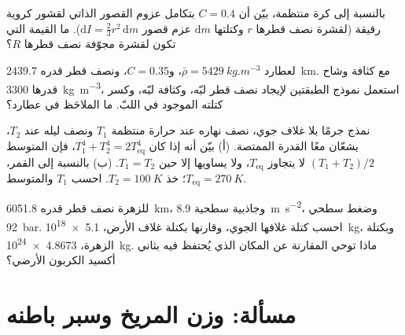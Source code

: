 \begin{exercise}[$\star\star$]\label{exo:b1:comparative-planetology:9}
بالنسبة إلى كرة منتظمة، بيّن أن $C = 0.4$ بتكامل عزوم القصور الذاتي لقشور كروية رقيقة (لقشرة نصف قطرها $r$ وكتلتها $\mathrm dm$ عزم قصور $\mathrm dI = \tfrac23 r^2\,\mathrm dm$). ما القيمة التي تكون لقشرة مجوّفة نصف قطرها $R$؟
\end{exercise}

\begin{exercise}[$\star\star\star$]\label{exo:b1:comparative-planetology:10}
لعطارد $\bar\rho = \qty{5429}{kg.m^{-3}}$، و$C = 0.35$، ونصف قطر قدره \qty{2439.7}{km}. مع كثافة وشاح قدرها \qty{3300}{kg.m^{-3}}، استعمل نموذج الطبقتين لإيجاد نصف قطر لبّه، وكثافة لبّه، وكسر كتلته الموجود في اللبّ. ما الملاحَظ في عطارد؟
\end{exercise}

\begin{exercise}[$\star\star\star$]\label{exo:b1:comparative-planetology:11}
نمذج جرمًا بلا غلاف جوي، نصف نهاره عند حرارة منتظمة $T_1$ ونصف ليله عند $T_2$، يشعّان معًا القدرة الممتصة. (أ) بيّن أنه إذا كان $T_1^4 + T_2^4 = 2T_\mathrm{eq}^4$، فإن المتوسط $(T_1 + T_2)/2$ لا يتجاوز $T_\mathrm{eq}$، ولا يساويها إلا حين $T_1 = T_2$. (ب) بالنسبة إلى القمر، $T_\mathrm{eq} = \qty{270}{K}$؛ خذ $T_2 = \qty{100}{K}$. احسب $T_1$ والمتوسط.
\end{exercise}

\begin{exercise}[$\star\star\star$]\label{exo:b1:comparative-planetology:12}
للزهرة نصف قطر قدره \qty{6051.8}{km}، وجاذبية سطحية \qty{8.9}{m.s^{-2}}، وضغط سطحي \qty{92}{bar}. احسب كتلة غلافها الجوي، وقارنها بكتلة غلاف الأرض، \qty{5.1e18}{kg}، وبكتلة الزهرة، \qty{4.8673e24}{kg}. ماذا توحي المقارنة عن المكان الذي يُحتفظ فيه بثاني أكسيد الكربون الأرضي؟
\end{exercise}

\section{مسألة: وزن المريخ وسبر باطنه}

